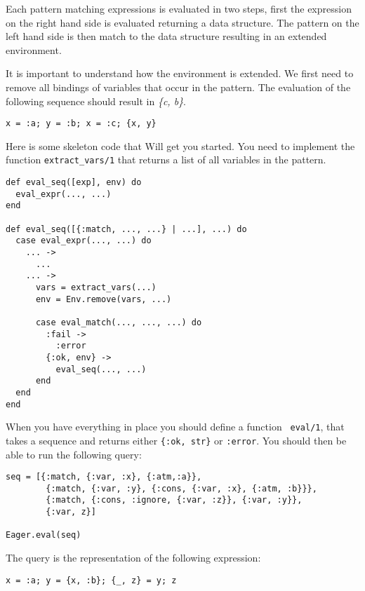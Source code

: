 \documentclass[a4paper,11pt]{article}
\begin{document}
Each pattern matching expressions is evaluated in two steps, first the
expression on the right hand side is evaluated returning a data
structure. The pattern on the left hand side is then match to the data
structure resulting in an extended environment.

It is important to understand how the environment is extended. We
first need to remove all bindings of variables that occur in the
pattern. The evaluation of the following sequence should result in {\em \{c, b\}}.

\begin{verbatim}
x = :a; y = :b; x = :c; {x, y}
\end{verbatim}

Here is some skeleton code that Will get you started. You need to
implement the function {\tt extract_vars/1} that returns a list of all
variables in the pattern.

\begin{verbatim}
def eval_seq([exp], env) do
  eval_expr(..., ...)
end

def eval_seq([{:match, ..., ...} | ...], ...) do
  case eval_expr(..., ...) do
    ... ->
      ...
    ... ->
      vars = extract_vars(...)
      env = Env.remove(vars, ...)

      case eval_match(..., ..., ...) do
        :fail ->
          :error
        {:ok, env} ->
          eval_seq(..., ...)
      end
  end
end
\end{verbatim}

When you have everything in place you should define a function {\tt
  eval/1}, that takes a sequence and returns either {\tt \{:ok, str\}}
or {\tt :error}. You should then be able to run the following query:

\begin{verbatim}
seq = [{:match, {:var, :x}, {:atm,:a}},
        {:match, {:var, :y}, {:cons, {:var, :x}, {:atm, :b}}},
        {:match, {:cons, :ignore, {:var, :z}}, {:var, :y}},
        {:var, z}]

Eager.eval(seq)
\end{verbatim}

The query is the representation of the following expression:

\begin{verbatim}
x = :a; y = {x, :b}; {_, z} = y; z
\end{verbatim}


\end{document}
